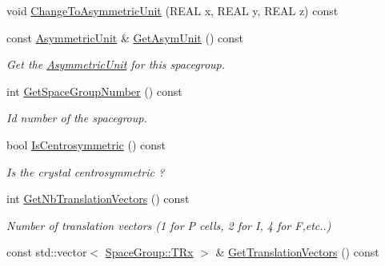 \begin{DoxyCompactItemize}
void \mbox{\hyperlink{class_obj_cryst_1_1_space_group_a11651737de9e6ba328fffacce8a46b5a}{Change\+To\+Asymmetric\+Unit}} (R\+E\+AL x, R\+E\+AL y, R\+E\+AL z) const
\item 
\mbox{\label{class_obj_cryst_1_1_space_group_ae8f77e34db1db64164f54bdf1b76a30a}} 
const \mbox{\hyperlink{class_obj_cryst_1_1_asymmetric_unit}{Asymmetric\+Unit}} \& \mbox{\hyperlink{class_obj_cryst_1_1_space_group_ae8f77e34db1db64164f54bdf1b76a30a}{Get\+Asym\+Unit}} () const
\begin{DoxyCompactList}\small\item\em Get the \mbox{\hyperlink{class_obj_cryst_1_1_asymmetric_unit}{Asymmetric\+Unit}} for this spacegroup. \end{DoxyCompactList}\item 
\mbox{\label{class_obj_cryst_1_1_space_group_a914c50cfe2b9efbab98b7940bfff995a}} 
int \mbox{\hyperlink{class_obj_cryst_1_1_space_group_a914c50cfe2b9efbab98b7940bfff995a}{Get\+Space\+Group\+Number}} () const
\begin{DoxyCompactList}\small\item\em Id number of the spacegroup. \end{DoxyCompactList}\item 
\mbox{\label{class_obj_cryst_1_1_space_group_ab379ea3ae8f70b96e325bcd694a0ee71}} 
bool \mbox{\hyperlink{class_obj_cryst_1_1_space_group_ab379ea3ae8f70b96e325bcd694a0ee71}{Is\+Centrosymmetric}} () const
\begin{DoxyCompactList}\small\item\em Is the crystal centrosymmetric ? \end{DoxyCompactList}\item 
int \mbox{\hyperlink{class_obj_cryst_1_1_space_group_ab29b2dbdb97ed82c9b609c7f59a3e656}{Get\+Nb\+Translation\+Vectors}} () const
\begin{DoxyCompactList}\small\item\em Number of translation vectors (1 for \textquotesingle{}P\textquotesingle{} cells, 2 for \textquotesingle{}I\textquotesingle{}, 4 for \textquotesingle{}F\textquotesingle{},etc..) \end{DoxyCompactList}\item 
const std\+::vector$<$ \mbox{\hyperlink{struct_obj_cryst_1_1_space_group_1_1_t_rx}{Space\+Group\+::\+T\+Rx}} $>$ \& \mbox{\hyperlink{class_obj_cryst_1_1_space_group_af0ee74eb5826d86a67e70a6113b7b34d}{Get\+Translation\+Vectors}} () const

\end{DoxyCompactItemize}
